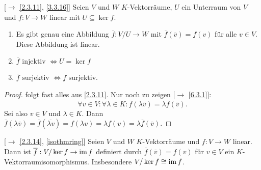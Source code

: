 \documentclass[../../main.tex]{subfiles}
\begin{document}
\begin{sat}\label{8.1.9}
{\rm[$\to$ \ref{2.3.11}, \ref{3.3.16}]} Seien $V$ und $W$ $K$-Vektorräume, $U$ ein Unterraum von $V$ und $f\colon V\to W$ linear mit $U\subseteq \ker f$.
\begin{enumerate}[\rm(a)]
\item Es gibt genau eine Abbildung $\overline{f}: V/U\to W$ mit $\overline{f}(\overline{v})= f(v)$ für alle $v\in V$. Diese Abbildung ist linear.
\item $\overline{f} \text{ injektiv }\iff U = \ker f$
\item $\overline{f} \text{ surjektiv } \iff f \text{ surjektiv}$.
\end{enumerate}
\end{sat}
\begin{proof}
folgt fast alles aus \ref{2.3.11}. Nur noch zu zeigen [$\to$ \ref{6.3.1}]:
\[\forall v\in V:\forall \lambda\in K:\overline{f}(\lambda \overline{v}) = \lambda\overline{f}(\overline{v}).\] Sei also $v\in V$ und $\lambda\in K$. Dann $\overline{f}(\lambda\overline{v}) = \overline{f}(\overline{\lambda v}) = f(\lambda v) = \lambda f(v) = \lambda\overline{f}(\overline{v})$.
\end{proof}

\begin{kor}\label{8.1.10}
{\rm[$\to$ \ref{2.3.14}, \ref{isothmring}]} Seien $V$ und $W$ $K$-Vektorräume und $f\colon V\to W$ linear. Dann ist $\overline{f}:V/\ker f\to \operatorname{im} f$ definiert durch $\overline{f}(\overline{v})= f(v)$ für $v\in V$ ein $K$-Vektorraumisomorphismus. Insbesondere $V/\ker f\cong \operatorname{im} f$.
\end{kor}
\end{document}
